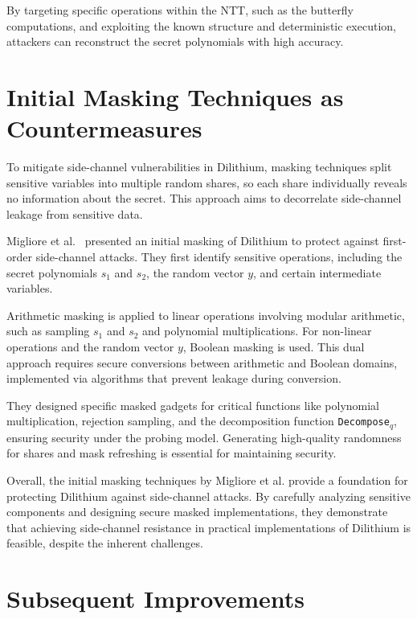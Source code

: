 By targeting specific operations within the \ac{NTT}, such as the butterfly computations, and exploiting the known structure and deterministic execution, attackers can reconstruct the secret polynomials with high accuracy.

\section{Initial Masking Techniques as Countermeasures}

To mitigate side-channel vulnerabilities in Dilithium, masking techniques split sensitive variables into multiple random shares, so each share individually reveals no information about the secret. This approach aims to decorrelate side-channel leakage from sensitive data.

Migliore et al.~\cite{Migliore19} presented an initial masking of Dilithium to protect against first-order side-channel attacks. They first identify sensitive operations, including the secret polynomials $s_1$ and $s_2$, the random vector $y$, and certain intermediate variables.

Arithmetic masking is applied to linear operations involving modular arithmetic, such as sampling $s_1$ and $s_2$ and polynomial multiplications. For non-linear operations and the random vector $y$, Boolean masking is used. This dual approach requires secure conversions between arithmetic and Boolean domains, implemented via algorithms that prevent leakage during conversion.

They designed specific masked gadgets for critical functions like polynomial multiplication, rejection sampling, and the decomposition function \texttt{Decompose$_q$}, ensuring security under the probing model. Generating high-quality randomness for shares and mask refreshing is essential for maintaining security.

Overall, the initial masking techniques by Migliore et al.\cite{Migliore19} provide a foundation for protecting Dilithium against side-channel attacks. By carefully analyzing sensitive components and designing secure masked implementations, they demonstrate that achieving side-channel resistance in practical implementations of Dilithium is feasible, despite the inherent challenges.



\section{Subsequent Improvements}


